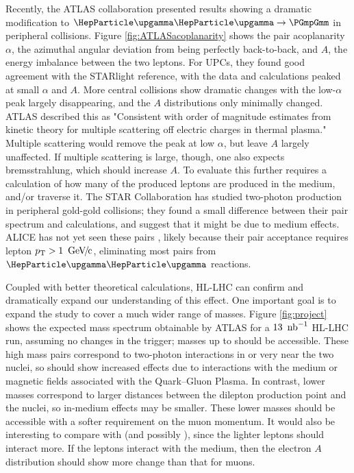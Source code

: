 \documentclass[../report.tex]{subfiles}
\begin{document}
Recently, the ATLAS collaboration \cite{Aaboud:2018eph} presented results showing a dramatic modification to $\PGg\PGg\rightarrow\PGmpGmm$ in peripheral collisions.  Figure \ref{fig:ATLASacoplanarity} shows the pair acoplanarity $\alpha$, the azimuthal angular deviation from being perfectly back-to-back, and $A$, the energy imbalance between the two leptons.  For UPCs, they found good agreement with the STARlight \cite{Baltz:2009jk,Klein:2016yzr} reference, with the data and calculations peaked at small $\alpha$ and $A$.   More central collisions show dramatic changes with the low-$\alpha$ peak largely disappearing, and the $A$ distributions only minimally changed.  ATLAS described this as "Consistent with order of magnitude estimates from kinetic theory for multiple scattering off electric charges in thermal plasma."  Multiple scattering would remove the peak at low $\alpha$, but leave $A$ largely unaffected.  If multiple scattering is large, though, one also expects bremsstrahlung, which should increase $A$.   To evaluate this further requires a calculation of how many of the produced leptons are produced in the medium, and/or traverse it.  The STAR Collaboration has studied two-photon \Pepem production in peripheral gold-gold collisions; they found a small difference between their pair  \pT{} spectrum and calculations, and suggest that it might be due to medium effects\cite{Adam:2018tdm}.    ALICE has not yet seen these pairs \cite{Adam:2015gba}, likely because their pair acceptance requires  lepton $\pT > \unit[1]{\UGeVc}$, eliminating most pairs from $\PGg\PGg$ reactions. 

Coupled with better theoretical calculations, HL-LHC can confirm and dramatically expand our understanding of this effect.   One important goal is to expand the study to cover a much wider range of masses.  Figure \ref{fig:project} shows the expected mass spectrum obtainable by ATLAS for a $\unit[13]{\Unb^{-1}}$ HL-LHC run, assuming no changes in the trigger; masses up to \unit[100]{\UGeVcc} should be accessible. These high mass pairs correspond to two-photon interactions in or very near the two nuclei, so should show increased effects due to interactions with the medium or magnetic fields associated with the Quark--Gluon Plasma. In contrast, lower masses correspond to larger distances between the dilepton production point and the nuclei, so in-medium effects may be smaller.  These lower masses should be accessible with a softer requirement on the muon momentum.   It would also be interesting to compare \Pepem with \PGmpGmm (and possibly \PGtp\PGtm), since the lighter leptons should interact more.  If the leptons interact with the medium, then the electron $A$ distribution should show more change than that for muons.  
\end{document}
